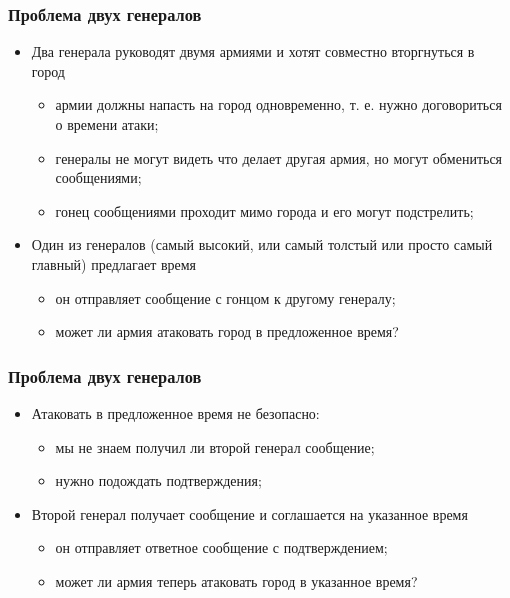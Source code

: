 \begin{frame}
\frametitle{Проблема двух генералов}
\begin{itemize}
  \item<1-> Два генерала руководят двумя армиями и хотят совместно вторгнуться в город
    \begin{itemize}
      \item армии должны напасть на город одновременно, т. е. нужно договориться о времени атаки;
      \item генералы не могут видеть что делает другая армия, но могут обмениться сообщениями;
      \item гонец сообщениями проходит мимо города и его могут подстрелить;
    \end{itemize}
  \item<2-> Один из генералов (самый высокий, или самый толстый или просто самый главный) предлагает время
    \begin{itemize}
      \item он отправляет сообщение с гонцом к другому генералу;
      \item может ли армия атаковать город в предложенное время?
    \end{itemize}
\end{itemize}
\end{frame}

\begin{frame}
\frametitle{Проблема двух генералов}
\begin{itemize}
  \item<1-> Атаковать в предложенное время не безопасно:
    \begin{itemize}
      \item мы не знаем получил ли второй генерал сообщение;
      \item нужно подождать подтверждения;
    \end{itemize}
  \item<2-> Второй генерал получает сообщение и соглашается на указанное время
    \begin{itemize}
      \item он отправляет ответное сообщение с подтверждением;
      \item может ли армия теперь атаковать город в указанное время?
    \end{itemize}
\end{itemize}
\end{frame}

